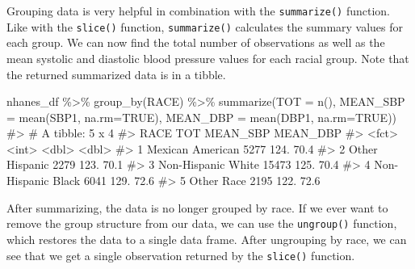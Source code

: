 \documentclass[
  letterpaper,
]{latex/krantz}
\makeatletter
\newenvironment{Shaded}{\begin{snugshade}}{\end{snugshade}}
\newcommand{\AttributeTok}[1]{\textcolor[rgb]{0.40,0.45,0.13}{#1}}
\newcommand{\CommentTok}[1]{\textcolor[rgb]{0.37,0.37,0.37}{#1}}
\newcommand{\ConstantTok}[1]{\textcolor[rgb]{0.56,0.35,0.01}{#1}}
\newcommand{\FunctionTok}[1]{\textcolor[rgb]{0.28,0.35,0.67}{#1}}
\newcommand{\NormalTok}[1]{\textcolor[rgb]{0.00,0.23,0.31}{#1}}
\newcommand{\SpecialCharTok}[1]{\textcolor[rgb]{0.37,0.37,0.37}{#1}}
\newenvironment{kframe}{%
\medskip{}
\setlength{\fboxsep}{.8em}
 \def\at@end@of@kframe{}%
 \ifinner\ifhmode%
  \def\at@end@of@kframe{\end{minipage}}%
  \begin{minipage}{\columnwidth}%
 \fi\fi%
 \def\FrameCommand##1{\hskip\@totalleftmargin \hskip-\fboxsep
 \colorbox{shadecolor}{##1}\hskip-\fboxsep
     \hskip-\linewidth \hskip-\@totalleftmargin \hskip\columnwidth}%
 \MakeFramed {\advance\hsize-\width
   \@totalleftmargin\z@ \linewidth\hsize
   \@setminipage}}%
 {\par\unskip\endMakeFramed%
 \at@end@of@kframe}
\renewenvironment{Shaded}{\begin{kframe}}{\end{kframe}}
\makeatother
\begin{document}
Grouping data is very helpful in combination with the
\texttt{summarize()} function. Like with the \texttt{slice()} function,
\texttt{summarize()}
calculates the summary values for each group. We can now find the total
number of observations as well as the mean systolic and diastolic blood
pressure values for each racial group. Note that the returned summarized
data is in a tibble.

\begin{Shaded}
\begin{Highlighting}[]
\NormalTok{nhanes\_df }\SpecialCharTok{\%\textgreater{}\%} 
  \FunctionTok{group\_by}\NormalTok{(RACE) }\SpecialCharTok{\%\textgreater{}\%}
  \FunctionTok{summarize}\NormalTok{(}\AttributeTok{TOT =} \FunctionTok{n}\NormalTok{(), }\AttributeTok{MEAN\_SBP =} \FunctionTok{mean}\NormalTok{(SBP1, }\AttributeTok{na.rm=}\ConstantTok{TRUE}\NormalTok{), }
            \AttributeTok{MEAN\_DBP =} \FunctionTok{mean}\NormalTok{(DBP1, }\AttributeTok{na.rm=}\ConstantTok{TRUE}\NormalTok{))}
\CommentTok{\#\textgreater{} \# A tibble: 5 x 4}
\CommentTok{\#\textgreater{}   RACE                 TOT MEAN\_SBP MEAN\_DBP}
\CommentTok{\#\textgreater{}   \textless{}fct\textgreater{}              \textless{}int\textgreater{}    \textless{}dbl\textgreater{}    \textless{}dbl\textgreater{}}
\CommentTok{\#\textgreater{} 1 Mexican American    5277     124.     70.4}
\CommentTok{\#\textgreater{} 2 Other Hispanic      2279     123.     70.1}
\CommentTok{\#\textgreater{} 3 Non{-}Hispanic White 15473     125.     70.4}
\CommentTok{\#\textgreater{} 4 Non{-}Hispanic Black  6041     129.     72.6}
\CommentTok{\#\textgreater{} 5 Other Race          2195     122.     72.6}
\end{Highlighting}
\end{Shaded}

After summarizing, the data is no longer grouped by race. If we ever
want to remove the group structure from our data, we can use the
\texttt{ungroup()}
function, which restores the data to a single data frame. After
ungrouping by race, we can see that we get a single observation returned
by the \texttt{slice()} function.
\end{document}

